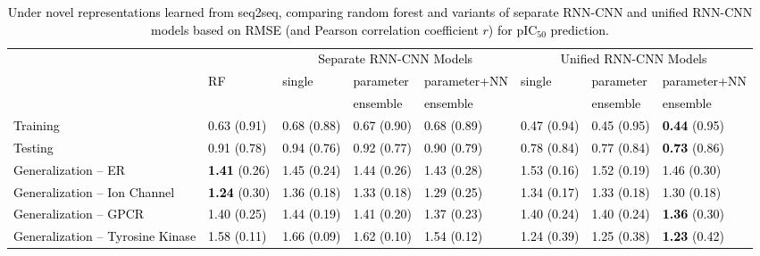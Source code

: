 \documentclass[nocrop]{bioinfo}
\newcommand{\red}[1]{\textcolor{black}{#1}}
\begin{document}
\begin{table*}[!htb]
\centering
{
\red{
\begin{tabular}{l|l|lll|lll}
\toprule
&  & \multicolumn{3}{c|}{Separate RNN-CNN Models}  &\multicolumn{3}{c}{Unified RNN-CNN Models}\\ \cline{3-8}
&  RF  & single & parameter &parameter+NN & single & parameter  & parameter+NN\\
    &   &  & ensemble&ensemble&  & ensemble  & ensemble\\
  \hline
 Training & 0.63 (0.91) & 0.68 (0.88)&0.67 (0.90)&0.68 (0.89)&0.47 (0.94)&0.45 (0.95)&\textbf{0.44} (0.95)\\
 \hline
 Testing & 0.91 (0.78) & 0.94 (0.76) & 0.92 (0.77)&0.90 (0.79)&0.78 (0.84)&0.77 (0.84)&\textbf{0.73} (0.86)\\
   \hline
 Generalization -- ER & \textbf{1.41} (0.26)& 1.45 (0.24) & 1.44 (0.26)&1.43 (0.28)&1.53 (0.16)&1.52 (0.19)&1.46 (0.30)\\
 \hline
 Generalization -- Ion Channel & \textbf{1.24} (0.30)& 1.36 (0.18) &1.33 (0.18)&1.29 (0.25)&1.34 (0.17)&1.33 (0.18)&1.30 (0.18)\\
   \hline
 Generalization -- GPCR &  1.40 (0.25)& 1.44 (0.19)&1.41 (0.20)&1.37 (0.23)&1.40 (0.24)&1.40 (0.24)&\textbf{1.36} (0.30)\\
    \hline
 Generalization -- Tyrosine Kinase &  1.58 (0.11) & 1.66 (0.09)&1.62 (0.10)&1.54 (0.12)&1.24 (0.39)&1.25 (0.38)&\textbf{1.23} (0.42)\\
 \hline
\end{tabular}
}
}
\caption{Under novel representations learned from seq2seq, comparing random forest and variants of separate RNN-CNN and unified RNN-CNN models based on RMSE  (and Pearson correlation \red{coefficient $r$}) for pIC$_{50}$ prediction.}
\label{table:genaral_acc}
\end{table*}
\vspace{-1em}
\end{document}
